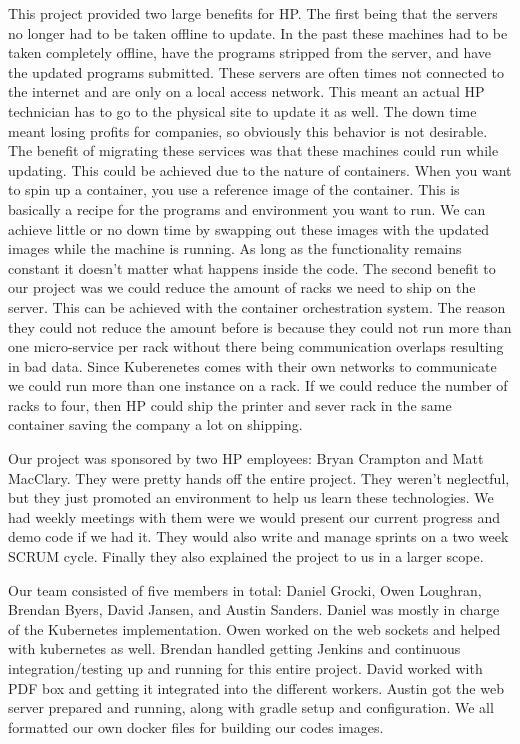 \documentclass[onecolumn, draftclsnofoot,10pt, compsoc]{IEEEtran}
\begin{document}
This project provided two large benefits for HP. 
The first being that the servers no longer had to be taken offline to update. 
In the past these machines had to be taken completely offline, have the programs stripped from the server, and have the updated programs submitted. 
These servers are often times not connected to the internet and are only on a local access network.
This meant an actual HP technician has to go to the physical site to update it as well. 
The down time meant losing profits for companies, so obviously this behavior is not desirable. 
The benefit of migrating these services was that these machines could run while updating. 
This could be achieved due to the nature of containers. 
When you want to spin up a container, you use a reference image of the container. 
This is basically a recipe for the programs and environment you want to run. 
We can achieve little or no down time by swapping out these images with the updated images while the machine is running. 
As long as the functionality remains constant it doesn't matter what happens inside the code.
The second benefit to our project was we could reduce the amount of racks we need to ship on the server. 
This can be achieved with the container orchestration system. 
The reason they could not reduce the amount before is because they could not run more than one micro-service per rack without there being communication overlaps resulting in bad data. 
Since Kuberenetes comes with their own networks to communicate we could run more than one instance on a rack. 
If we could reduce the number of racks to four, then HP could ship the printer and sever rack in the same container saving the company a lot on shipping.

Our project was sponsored by two HP employees: Bryan Crampton and Matt MacClary. 
They were pretty hands off the entire project. 
They weren't neglectful, but they just promoted an environment to help us learn these technologies. 
We had weekly meetings with them were we would present our current progress and demo code if we had it. 
They would also write and manage sprints on a two week SCRUM cycle. 
Finally they also explained the project to us in a larger scope.

Our team consisted of five members in total: Daniel Grocki, Owen Loughran, Brendan Byers, David Jansen, and Austin Sanders.
Daniel was mostly in charge of the Kubernetes implementation. 
Owen worked on the web sockets and helped with kubernetes as well. 
Brendan handled getting Jenkins and continuous integration/testing up and running for this entire project. 
David worked with PDF box and getting it integrated into the different workers. Austin got the web server prepared and running, along with gradle setup and configuration.  
We all formatted our own docker files for building our codes images.
\end{document}
